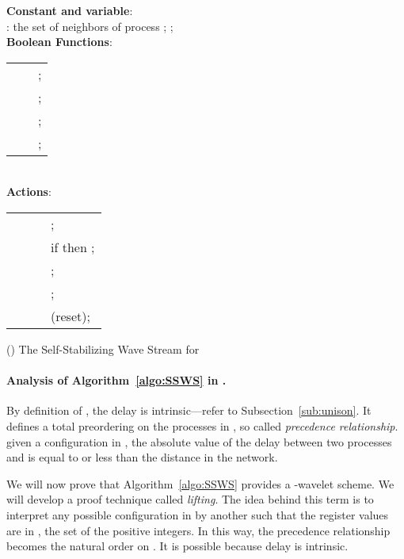 \documentclass[11pt]{article}
\begin{document}
\begin{algorithm}
\begin{footnotesize}
\noindent
{\bf Constant and variable}:\\
\hspace*{0.3cm}
: the set of neighbors of process ; ;\\
\noindent
{\bf Boolean Functions}:\\
\noindent
\hspace*{0.3cm}
\begin{tabular}{@{}lcl}
& &;\\
 & & ;\\
 & & ;\\
 & &
      ;\\
\end{tabular}\\
{\bf Actions}:\\
\noindent
\hspace*{0.3cm}
\begin{tabular}{@{}rlcl}
 &   &  &  ; \\
   &&& if  then  ;\\
   &&&  ;\\

   
 &  &  &
   ;\\
 &  &  &
    (reset);\\  
   

\end{tabular}
\end{footnotesize}
\caption{() The Self-Stabilizing Wave Stream  for }
\label{algo:SSWS}
\end{algorithm}


\paragraph{Analysis of Algorithm~\ref{algo:SSWS} in .}
\label{sec:Unison_analysis}

By definition of , the delay is intrinsic---refer to Subsection~\ref{sub:unison}. 
It defines a total preordering  on the processes in , so called \emph{precedence relationship}. 
given a configuration in , the absolute value of the delay between two processes  
 and  is equal to or less than the distance  in the network. 


We will now prove that Algorithm~\ref{algo:SSWS} provides a -wavelet scheme.  We will develop a proof technique 
called \emph{lifting}.  The idea behind this term is to interpret any possible configuration in  
by another such that the register values are in , the set of the positive integers.  In this way, 
the precedence relationship becomes the natural order on . It is possible because delay is intrinsic.
\end{document}

